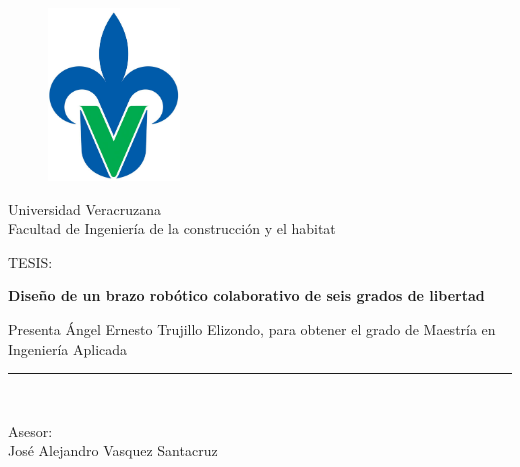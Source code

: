 \begin{titlepage}

\begin{center}
\vspace*{-1in}
\begin{figure}[htb]
\begin{center}
\includegraphics[width=3.5cm]{./img/chapter0/logouv2.jpg}
\end{center}
\end{figure}
\begin{Large}
Universidad Veracruzana
\\
\vspace*{0.15in}
Facultad de Ingeniería de la construcción y el habitat \\
\vspace*{0.6in}
\end{Large}
\begin{large}
TESIS:\\
\end{large}
\vspace*{0.2in}
\begin{Large}
\textbf{Diseño de un brazo robótico colaborativo de seis grados de libertad} \\
\end{Large}
\vspace*{0.3in}
\begin{large}
Presenta Ángel Ernesto Trujillo Elizondo, para obtener el grado de Maestría en Ingeniería Aplicada\\
\end{large}
\vspace*{0.3in}
\rule{80mm}{0.1mm}\\
\vspace*{0.1in}
\begin{large}
Asesor: \\
José Alejandro Vasquez Santacruz \\
\end{large}
\end{center}
\end{titlepage}


